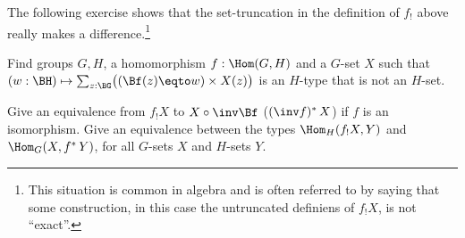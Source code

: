The following exercise shows that the set-truncation in the definition
of $f_!$ above really makes a difference.\footnote{%
    This situation is common in algebra and is often referred to by saying
    that some construction, in this case the untruncated
    definiens of $f_!X$, is not ``exact''. %
  }

\begin{xca}\label{xca:why-setTrunc_f_!}
Find groups $G,H$, a homomorphism $f:\Hom(G,H)$ and a $G$-set $X$ such
that $(w:\BH)\mapsto\sum_{z:\BG}\bigl((\Bf(z) \eqto w)\times X(z)\bigr)$
is an $H$-type that is not an $H$-set.
\end{xca}

\begin{xca}\label{xca:adjunction-_!-^*}
    Give an equivalence from $f_!X$ to $X\circ\inv\Bf$ (\ie $(\inv f)^*\,X$)
    if $f$ is an isomorphism.
    Give an equivalence between the
    types $\Hom_H(f_!X,Y)$ and $\Hom_G(X,f^*\,Y)$,
    for all $G$-sets $X$ and $H$-sets $Y$.
\end{xca}

